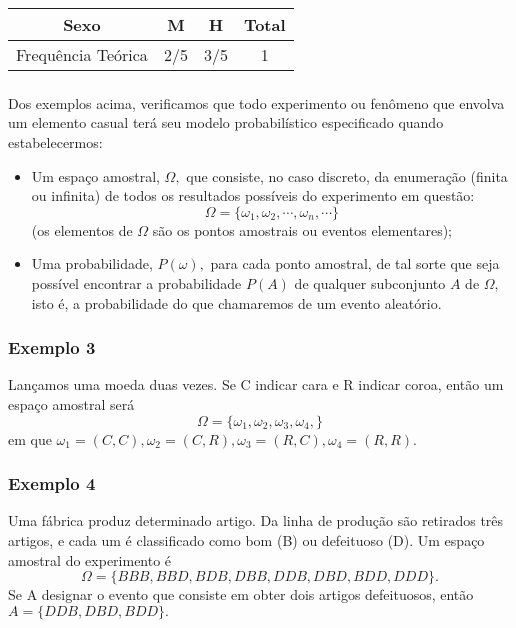\documentclass[14pt,aspectratio=1610]{beamer}
\begin{document}
\begin{frame}{}
\frametitle{}
\begin{block}{}
\centering
\begin{tabular}{c|c|c|c}
\hline
Sexo&M&H&Total\\
\hline
Frequência Teórica&2/5&3/5&1\\
\hline
\end{tabular}
\end{block}
\end{frame}

\begin{frame}{}
\frametitle{}
\begin{block}{}
\justifying
Dos exemplos acima, verificamos que todo experimento ou fenômeno que envolva
um elemento casual terá seu modelo probabilístico especificado quando estabelecermos:
\begin{itemize}
\item Um espaço amostral, $\Omega,$ que consiste, no caso discreto, da enumeração (finita ou infinita) de todos os resultados possíveis do experimento em questão:
$$\Omega=\{\omega_{1},\omega_{2},\cdots,\omega_{n},\cdots\}$$
(os elementos de $\Omega$ são os pontos amostrais ou eventos elementares);\pause
\item Uma probabilidade, $P(\omega),$ para cada ponto amostral, de tal sorte que seja possível encontrar a probabilidade $P(A)$ de qualquer subconjunto $A$ de $\Omega,$ isto é, a probabilidade do que chamaremos de um evento aleatório.
\end{itemize}
\end{block}
\end{frame}

\begin{frame}{}
\frametitle{Exemplo 3}
\begin{block}{}
\justifying
Lançamos uma moeda duas vezes. Se C indicar cara e R indicar coroa,
então um espaço amostral será $$\Omega=\{\omega_{1},\omega_{2},\omega_{3},\omega_{4},\}$$
em que $\omega_{1}=(C,C), \omega_{2}=(C,R),\omega_{3}=(R,C), \omega_{4}=(R,R).$ 
\end{block}
\end{frame}

\begin{frame}{}
\frametitle{Exemplo 4}
\begin{block}{}
\justifying
Uma fábrica produz determinado artigo. Da linha de produção são retirados
três artigos, e cada um é classificado como bom (B) ou defeituoso (D). Um
espaço amostral do experimento é
$$\Omega = \{BBB, BBD, BDB, DBB, DDB, DBD, BDD, DDD\}.$$
Se A designar o evento que consiste em obter dois artigos defeituosos, então
$A = \{DDB, DBD, BDD\}.$
\end{block}
\end{frame}
\end{document}
